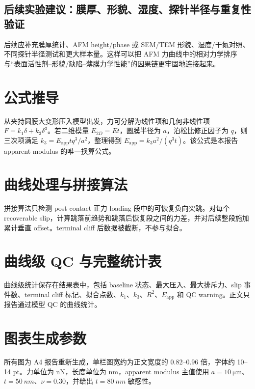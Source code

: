 \documentclass[UTF8,11pt,fontset=fandol]{ctexart}
\begin{document}
\subsection{后续实验建议：膜厚、形貌、湿度、探针半径与重复性验证}
后续应补充膜厚统计、AFM height/phase 或 SEM/TEM 形貌、湿度/干氮对照、不同探针半径测试和更大样本量。这样可以把 AFM 力曲线中的相对力学排序与“表面活性剂--形貌/缺陷--薄膜力学性能”的因果链更牢固地连接起来。

\appendix
\section{公式推导}
从夹持圆膜大变形压入模型出发，力可分解为线性项和几何非线性项 $F=k_1\delta+k_3\delta^3$。若二维模量 $E_{2D}=Et$，圆膜半径为 $a$，泊松比修正因子为 $q$，则三次项满足 $k_3=E_\mathrm{app}tq^3/a^2$，整理得到 $E_\mathrm{app}=k_3a^2/(q^3t)$。该公式是本报告 apparent modulus 的唯一换算公式。

\section{曲线处理与拼接算法}
拼接算法只检测 post-contact 正力 loading 段中的可恢复负向突跳。对每个 recoverable slip，计算跳落前趋势和跳落后恢复段之间的力差，并对后续整段施加累计垂直 offset。terminal cliff 后数据被截断，不参与拟合。

\section{曲线级 QC 与完整统计表}
曲线级统计保存在结果表中，包括 baseline 状态、最大压入、最大排斥力、slip 事件数、terminal cliff 标记、拟合点数、$k_1$、$k_3$、$R^2$、$E_\mathrm{app}$ 和 QC warning。正文只报告通过模型 QC 的曲线统计。

\section{图表生成参数}
所有图为 A4 报告重新生成，单栏图宽约为正文宽度的 0.82--0.96 倍，字体约 10--14 pt。力单位为 nN，长度单位为 nm，apparent modulus 主值使用 $a=\SI{10}{\micro\meter}$、$t=\SI{50}{nm}$、$\nu=0.30$，并给出 $t=\SI{80}{nm}$ 敏感性。
\end{document}
